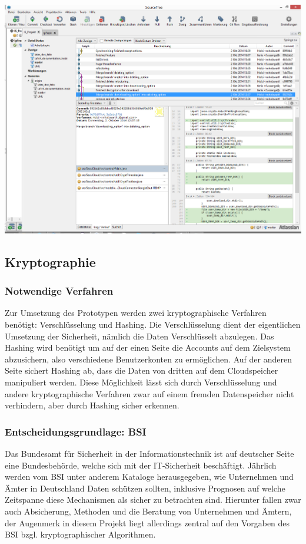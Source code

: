 \documentclass[13pt,a4paper,bibliography=totocnumbered,listof=totocnumbered]{scrartcl}
\begin{document}
\vspace{1em}
$\;$\\
\begin{minipage}{\linewidth}
	\centering
	\includegraphics[width=0.8\linewidth]{./img/SourceTree.png}
	\label{SourceTreeV}
\end{minipage}
\vspace{1em}
  \pagebreak

\subsection{Kryptographie}
\subsubsection{Notwendige Verfahren}
Zur Umsetzung des Prototypen werden zwei kryptographische Verfahren benötigt: Verschlüsselung und Hashing. Die Verschlüsselung dient der eigentlichen Umsetzung der Sicherheit, nämlich die Daten Verschlüsselt abzulegen. Das Hashing wird benötigt um auf der einen Seite die Accounts auf dem Zielsystem abzusichern, also verschiedene Benutzerkonten zu ermöglichen. Auf der anderen Seite sichert Hashing ab, dass die Daten von dritten auf dem Cloudspeicher manipuliert werden. Diese Möglichkeit lässt sich durch Verschlüsselung und andere kryptographische Verfahren zwar auf einem fremden Datenspeicher nicht verhindern, aber durch Hashing sicher erkennen.

\subsubsection{Entscheidungsgrundlage: BSI}
Das Bundesamt für Sicherheit in der Informationstechnik ist auf deutscher Seite eine Bundesbehörde, welche sich mit der IT-Sicherheit beschäftigt. Jährlich werden vom BSI unter anderem Kataloge herausgegeben, wie Unternehmen und Ämter in Deutschland Daten schützen sollten, inklusive Prognosen auf welche Zeitspanne diese Mechanismen als sicher zu betrachten sind. Hierunter fallen zwar auch Absicherung, Methoden und die  Beratung von Unternehmen und Ämtern, der Augenmerk in diesem Projekt liegt allerdings zentral auf den Vorgaben des BSI bzgl. kryptographischer Algorithmen.
\end{document}
